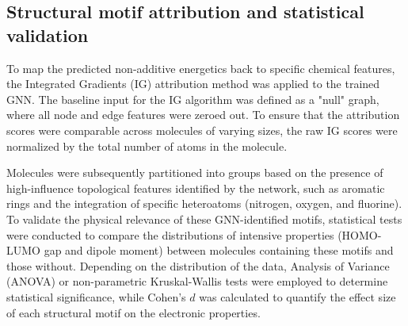 \documentclass[]{article}
\begin{document}
\subsection{Structural motif attribution and statistical validation}
To map the predicted non-additive energetics back to specific chemical features, the Integrated Gradients (IG) attribution method was applied to the trained GNN. The baseline input for the IG algorithm was defined as a "null" graph, where all node and edge features were zeroed out. To ensure that the attribution scores were comparable across molecules of varying sizes, the raw IG scores were normalized by the total number of atoms in the molecule.

Molecules were subsequently partitioned into groups based on the presence of high-influence topological features identified by the network, such as aromatic rings and the integration of specific heteroatoms (nitrogen, oxygen, and fluorine). To validate the physical relevance of these GNN-identified motifs, statistical tests were conducted to compare the distributions of intensive properties (HOMO-LUMO gap and dipole moment) between molecules containing these motifs and those without. Depending on the distribution of the data, Analysis of Variance (ANOVA) or non-parametric Kruskal-Wallis tests were employed to determine statistical significance, while Cohen's $d$ was calculated to quantify the effect size of each structural motif on the electronic properties.
\end{document}
